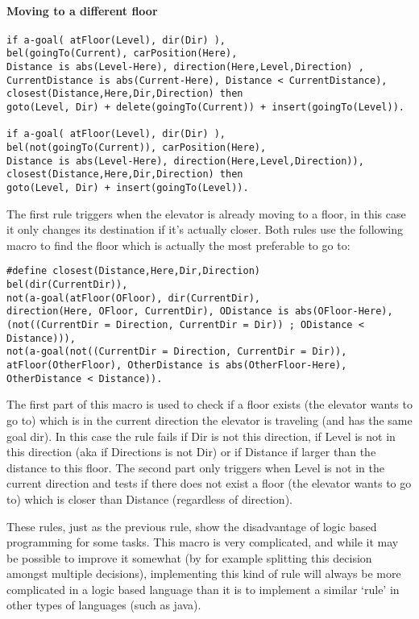 \documentclass[a4paper,11pt]{article}
\begin{document}
\paragraph*{Moving to a different floor}
\begin{verbatim}
if a-goal( atFloor(Level), dir(Dir) ),
bel(goingTo(Current), carPosition(Here), 
Distance is abs(Level-Here), direction(Here,Level,Direction) , 
CurrentDistance is abs(Current-Here), Distance < CurrentDistance),
closest(Distance,Here,Dir,Direction) then 
goto(Level, Dir) + delete(goingTo(Current)) + insert(goingTo(Level)).

if a-goal( atFloor(Level), dir(Dir) ),
bel(not(goingTo(Current)), carPosition(Here), 
Distance is abs(Level-Here), direction(Here,Level,Direction)),
closest(Distance,Here,Dir,Direction) then
goto(Level, Dir) + insert(goingTo(Level)).
\end{verbatim}

The first rule triggers when the elevator is already moving to a floor, in this case it only changes its destination if it's actually closer. Both rules use the following macro to find the floor which is actually the most preferable to go to:

\begin{verbatim}
#define closest(Distance,Here,Dir,Direction)
bel(dir(CurrentDir)), 
not(a-goal(atFloor(OFloor), dir(CurrentDir), 
direction(Here, OFloor, CurrentDir), ODistance is abs(OFloor-Here),
(not((CurrentDir = Direction, CurrentDir = Dir)) ; ODistance < Distance))),
not(a-goal(not((CurrentDir = Direction, CurrentDir = Dir)), 
atFloor(OtherFloor), OtherDistance is abs(OtherFloor-Here), OtherDistance < Distance)).
\end{verbatim}

The first part of this macro is used to check if a floor exists (the elevator wants to go to) which is in the current direction the elevator is traveling (and has the same goal dir). In this case the rule fails if Dir is not this direction, if Level is not in this direction (aka if Directions is not Dir) or if Distance if larger than the distance to this floor. The second part only triggers when Level is not in the current direction and tests if there does not exist a floor (the elevator wants to go to) which is closer than Distance (regardless of direction).

These rules, just as the previous rule, show the disadvantage of logic based programming for some tasks. This macro is very complicated, and while it may be possible to improve it somewhat (by for example splitting this decision amongst multiple decisions), implementing this kind of rule will always be more complicated in a logic based language than it is to implement a similar `rule' in other types of languages (such as java).
\end{document}
